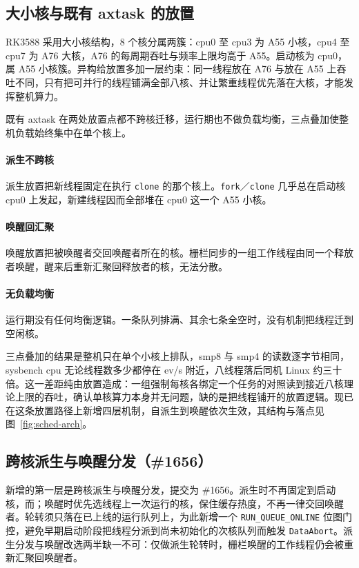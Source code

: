\subsection{大小核与既有 axtask 的放置}

RK3588 采用大小核结构，8 个核分属两簇：cpu0 至 cpu3 为 A55 小核，cpu4 至 cpu7 为 A76 大核，A76 的每周期吞吐与频率上限均高于 A55。启动核为 cpu0，属 A55 小核簇。异构给放置多加一层约束：同一线程放在 A76 与放在 A55 上吞吐不同，只有把可并行的线程铺满全部八核、并让繁重线程优先落在大核，才能发挥整机算力。

既有 axtask 在两处放置点都不跨核迁移，运行期也不做负载均衡，三点叠加使整机负载始终集中在单个核上。

\paragraph{派生不跨核} 派生放置把新线程固定在执行 \texttt{clone} 的那个核上。\texttt{fork}／\texttt{clone} 几乎总在启动核 cpu0 上发起，新建线程因而全部堆在 cpu0 这一个 A55 小核。

\paragraph{唤醒回汇聚} 唤醒放置把被唤醒者交回唤醒者所在的核。栅栏同步的一组工作线程由同一个释放者唤醒，醒来后重新汇聚回释放者的核，无法分散。

\paragraph{无负载均衡} 运行期没有任何均衡逻辑。一条队列排满、其余七条全空时，没有机制把线程迁到空闲核。

三点叠加的结果是整机只在单个小核上排队，smp8 与 smp4 的读数逐字节相同，sysbench cpu 无论线程数多少都停在 \nLadderBase{} ev/s 附近，八线程落后同机 Linux 约三十倍。这一差距纯由放置造成：一组强制每核各绑定一个任务的对照读到接近八核理论上限的吞吐，确认单核算力本身并无问题，缺的是把线程铺开的放置逻辑。现已在这条放置路径上新增四层机制，自派生到唤醒依次生效，其结构与落点见图~\ref{fig:sched-arch}。

\subsection{跨核派生与唤醒分发（\#1656）}

新增的第一层是跨核派生与唤醒分发，提交为 \#1656。派生时不再固定到启动核，而；唤醒时优先选线程上一次运行的核，保住缓存热度，不再一律交回唤醒者。轮转须只落在已上线的运行队列上，为此新增一个 \texttt{RUN\_QUEUE\_ONLINE} 位图门控，避免早期启动阶段把线程分派到尚未初始化的次核队列而触发 \texttt{DataAbort}。派生分发与唤醒改选两半缺一不可：仅做派生轮转时，栅栏唤醒的工作线程仍会被重新汇聚回唤醒者。

